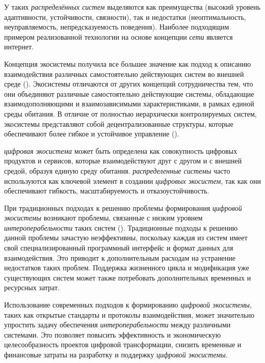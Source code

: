 У таких \textit{распределённых систем} выделяются как преимущества (высокий уровень адаптивности, устойчивости, связности), так и недостатки (неоптимальность, неуправляемость, непредсказуемость поведения). Наиболее подходящим примером реализованной технологии на основе концепции \textit{сети} является интернет.

Концепция экосистемы получила все большее значение как подход к описанию взаимодействия различных самостоятельно действующих систем во внешней среде (). Экосистемы отличаются от других концепций сотрудничества тем, что они объединяют различные самостоятельно действующие системы, обладающие взаимодополняющими и взаимозависимыми характеристиками, в рамках единой среды обитания. В отличие от полностью иерархически контролируемых систем, экосистемы представляют собой децентрализованные структуры, которые обеспечивают более гибкое и устойчивое управление ().

\textit{цифровая экосистема} может быть определена как совокупность цифровых продуктов и сервисов, которые взаимодействуют друг с другом и с внешней средой, образуя единую среду обитания. \textit{распределенные системы} часто используются как ключевой элемент в создании \textit{цифровых экосистем}, так как они обеспечивают гибкость, масштабируемость и отказоустойчивость.

При традиционных подходах к решению проблемы формирования \textit{цифровой экосистемы} возникают проблемы, связанные с низким уровнем \textit{интероперабельности} таких систем (). Традиционные подходы к решению данной проблемы зачастую неэффективны, поскольку каждая из систем имеет свой специализированный программный интерфейс и формат данных для взаимодействия. Это приводит к дополнительным расходам на устранение недостатков таких проблем. Поддержка жизненного цикла и модификация уже существующих систем может также потребовать дополнительных временных и ресурсных затрат.

Использование современных подходов к формированию \textit{цифровой экосистемы}, таких как открытые стандарты и протоколы взаимодействия, может значительно упростить задачу обеспечения \textit{интероперабельности} между различными системами. Это позволяет повысить эффективность и экономическую целесообразность проектов цифровой трансформации, снизить временные и финансовые затраты на разработку и поддержку \textit{цифровой экосистемы}.
